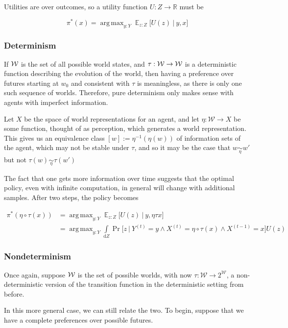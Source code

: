 \documentclass{book}
\DeclareMathOperator*{\argmax}{arg\,max}
\DeclareMathOperator*{\E}{\mathbb E}
\begin{document}
	Utilities are over outcomes, so a utility function $U : Z \to \mathbb R$ must be
	
	\[ \pi^*(x) = \argmax_{y: Y} \E_{z : Z} \Big[ U(z)~\Big|~ y,x\Big] \]
	
	\subsubsection{Determinism}
	If $\cal W$ is the set of all possible world states, and $\tau: \cal W \to W$ is a deterministic function describing the evolution of the world, then having a preference over futures starting at $w_0$ and consistent with $\tau$ is meaningless, as there is only one such sequence of worlds. Therefore, pure determinism only makes sense with agents with imperfect information. 
	
	Let $X$ be the space of world representations for an agent, and let $\eta: \mathcal W \to X$ be some function, thought of as perception, which generates a world representation. This gives us an equivalence class $[w] := \eta^{-1}(\eta(w))$ of information sets of the agent, which may not be stable under $\tau$, and so it may be the case that $w \underset\eta\sim w'$ but not $\tau(w) \underset\eta\sim \tau(w')$
	
	
	
	The fact that one gets more information over time suggests that the optimal policy, even with infinite computation, in general will change with additional samples. After two steps, the policy becomes
	
	\begin{align*}
		\pi^*(\eta\circ\tau (x)) &= \argmax_{y: Y} \E_{z : Z} \Big[ U(z)~\Big|~ y,\eta\tau x \Big]  \\
			&= \argmax_{y: Y} \int\limits_{\mathrm dZ} \Pr\Big[z~\Big|~Y^{(t)} = y \land X^{(t)}= \eta \circ \tau (x) \land X^{(t-1)} = x \Big] U(z)
	\end{align*}
		
	
	\subsubsection{Nondeterminism}
	Once again, suppose $\cal W$ is the set of possible worlds, with now $\tau: \mathcal W \to 2^{\mathcal W}$, a non-deterministic version of the transition function in the deterministic setting from before.
	
	In this more general case, we can still relate the two. To begin, suppose that we have a complete preferences over possible futures. 
	
\end{document}
